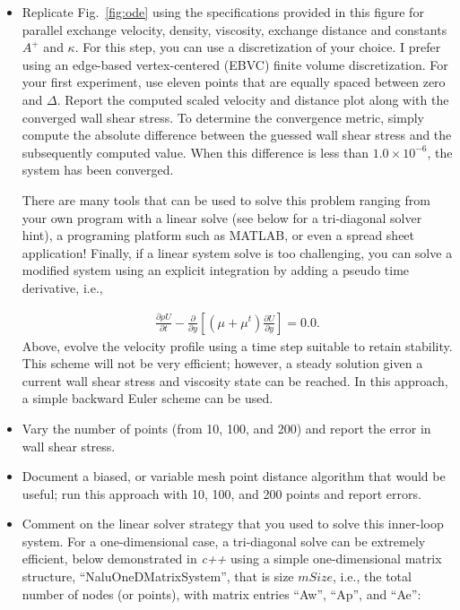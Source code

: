 \documentclass{article}
\begin{document}
\begin{itemize}

\item Replicate Fig.~\ref{fig:ode} using the specifications provided in this figure for parallel exchange 
velocity, density, viscosity, exchange distance and constants $A^+$ and $\kappa$. For this step, you can 
use a discretization of your choice. I prefer using an edge-based vertex-centered (EBVC) finite volume 
discretization. For your first experiment, use eleven points that are equally spaced between zero 
and $\Delta$. Report the computed scaled velocity and distance plot along with the converged wall 
shear stress. To determine the convergence metric, simply compute the absolute difference between the 
guessed wall shear stress and the subsequently computed value. When this difference is less than 
$1.0 \times 10^{-6}$, the system has been converged.

There are many tools that can be used to solve this problem ranging from your own program with a linear
solve (see below for a tri-diagonal solver hint), a programing platform such as MATLAB, or even a
spread sheet application! Finally, if a linear system solve is too challenging, you can solve 
a modified system using an explicit integration by adding a pseudo time derivative, i.e.,

\begin{align} 
      \frac{\partial \rho U}{\partial t} -\frac{\partial }{\partial y}\left[ \left(\mu + \mu^t\right) \frac{\partial U}{\partial y}  \right] = 0.0.
\label{odeExpressionExplicit}
\end{align}
Above, evolve the velocity profile using a time step suitable to retain stability. This
scheme will not be very efficient; however, a steady solution given a current wall shear stress
and viscosity state can be reached. In this approach, a simple backward Euler scheme can be used.

\item Vary the number of points (from 10, 100, and 200) and report the error in wall shear stress. 

\item Document a biased, or variable mesh point distance algorithm that would be useful; run this approach
with 10, 100, and 200 points and report errors.

\item Comment on the linear solver strategy that you used to solve this inner-loop system. For a one-dimensional case, 
a tri-diagonal solve can be extremely efficient, below demonstrated in \emph{c++} using a simple one-dimensional 
matrix structure, ``NaluOneDMatrixSystem'', that is size $mSize$, i.e., the total number of nodes (or points), 
with matrix entries ``Aw'', ``Ap'', and ``Ae'':


\end{itemize}
\end{document}
